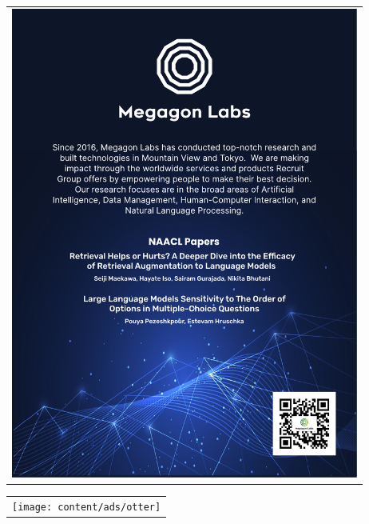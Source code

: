 \begin{center}\begin{tabular}{c}
  \includegraphics[width=4.5in]{content/ads/megagon} \\
\end{tabular}\end{center}
\begin{center}\begin{tabular}{c}
  \texttt{[image: content/ads/otter]} \\
\end{tabular}\end{center}
